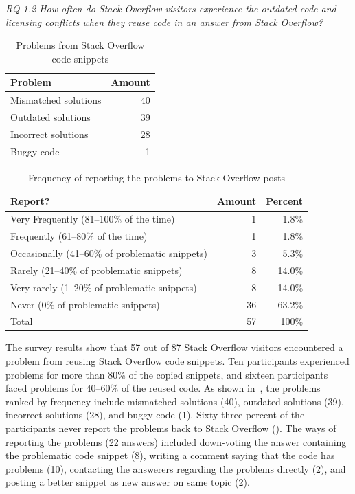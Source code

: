 \documentclass[10pt,journal,compsoc]{IEEEtran}
\begin{document}
\vspace{0.25cm}
\textit{RQ 1.2 How often do Stack Overflow
	visitors experience the outdated code and licensing conflicts when
	they reuse code in an answer from Stack Overflow?}
\vspace{0.25cm}

\begin{table}
	\centering
	\caption{Problems from Stack Overflow code snippets}
	\label{tab:visitor_survey_code_problems}
	\begin{tabular}{lr}
		\toprule
		Problem & Amount \\
		\midrule
		Mismatched solutions & 40 \\
		Outdated solutions & 39 \\
		Incorrect solutions	& 28 \\
		Buggy code & 1 \\
		\bottomrule
	\end{tabular}
\end{table}

\begin{table}
	\centering
	\caption{Frequency of reporting the problems to Stack Overflow posts}
	\label{tab:visitor_survey_report_problem}
	\begin{tabular}{lrr}
		\toprule
		Report? & Amount & Percent \\
		\midrule
		Very Frequently (81--100\% of the time)	& 1 & 1.8\% \\
		Frequently (61--80\% of the time) & 1 & 1.8\% \\
		Occasionally (41--60\% of problematic snippets) & 3 & 5.3\% \\
		Rarely (21--40\% of problematic snippets) & 8 & 14.0\% \\
		Very rarely (1--20\% of problematic snippets) & 8 & 14.0\% \\
		Never (0\% of problematic snippets) & 36 & 63.2\% \\
		\midrule
		Total & 57 & 100\% \\
		\bottomrule
	\end{tabular}
\end{table}

The survey results show that 57 out of 87 Stack Overflow visitors encountered a
problem from reusing Stack Overflow code snippets. Ten participants experienced
problems for more than 80\% of the copied snippets, and sixteen participants
faced problems for 40--60\% of the reused code. As shown in~, 
the problems ranked by frequency
include mismatched solutions (40), outdated solutions (39), incorrect solutions
(28), and buggy code (1). Sixty-three percent of the participants never report
the problems back to Stack Overflow (). 
The ways of reporting the problems
(22 answers) included down-voting the answer containing the problematic code
snippet (8), writing a comment saying that the code has problems (10),
contacting the answerers regarding the problems directly (2), and posting a
better snippet as new answer on same topic (2).
\end{document}
